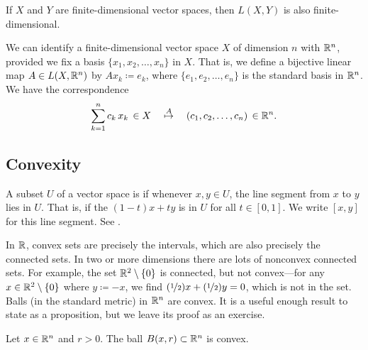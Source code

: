 \begin{prop} \label{prop:LXYfinitedim}
If $X$ and $Y$ are finite-dimensional vector spaces, then $L(X,Y)$
is also finite-dimensional.
\end{prop}

We can identify a finite-dimensional vector
space $X$ of dimension $n$ with ${\mathbb{R}}^n$, provided we fix a basis
$\{ x_1, x_2, \ldots, x_n \}$ in $X$.  That is, we define a bijective
linear map $A \in L(X,{\mathbb{R}}^n)$ by
$Ax_k \coloneqq e_k$, where $\{ e_1, e_2, \ldots, e_n \}$ is the standard
basis in ${\mathbb{R}}^n$.  We have
the correspondence
\begin{equation*}
\sum_{k=1}^n c_k \, x_k \, \in X
\quad
\overset{A}{\mapsto}
\quad
(c_1,c_2,\ldots,c_n) \, \in {\mathbb{R}}^n .
\end{equation*}

\subsection{Convexity}

A subset $U$ of a vector space is \emph{}
if whenever $x,y \in U$, the line segment from
$x$ to $y$ lies in $U$.  That is, if the \emph{}
$(1-t)x+ty$ is in $U$ for all $t \in [0,1]$.
We write $[x,y]$ for this line segment.
See .

\begin{myfigureht}
\caption{Convexity.\label{mv:convexcomb}}
\end{myfigureht}

In ${\mathbb{R}}$, convex sets are precisely the intervals, which are
also precisely the connected sets.
In two or more dimensions
there are lots of nonconvex connected sets.  For example,
the set ${\mathbb{R}}^2 \setminus \{0\}$ is connected,
but not convex---for any $x \in {\mathbb{R}}^2 \setminus \{0\}$ where $y \coloneqq -x$,
we find
$(\nicefrac{1}{2})x + (\nicefrac{1}{2})y = 0$, which is not in the set.
Balls (in the standard metric) in ${\mathbb{R}}^n$ are convex.  It is
a useful enough result to state as a proposition,
but we leave its proof as an exercise.

\begin{prop}
Let $x \in {\mathbb{R}}^n$ and $r > 0$.  The ball $B(x,r) \subset {\mathbb{R}}^n$
is convex.
\end{prop}

